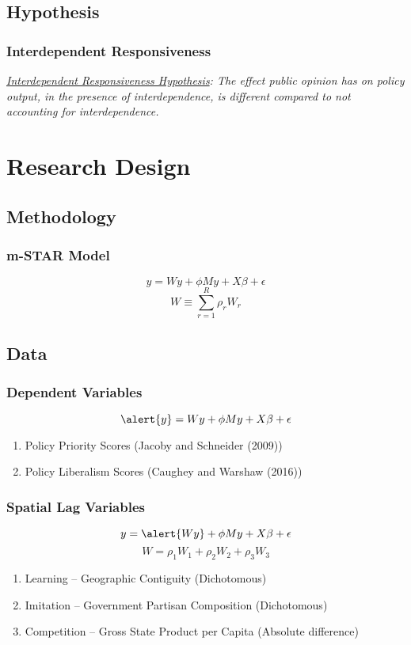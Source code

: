 \documentclass{beamer}
\begin{document}
\subsection{Hypothesis}

\begin{frame}
	\frametitle{Interdependent Responsiveness}
		\textit{\underline{Interdependent Responsiveness Hypothesis}: The effect public opinion has on policy output, in the presence of interdependence, is different compared to not accounting for interdependence.}
\end{frame}

\section{Research Design}
\subsection{Methodology}

\begin{frame}
	\frametitle{m-STAR Model}
		\[y=Wy+\phi My+X\beta+\epsilon\]
		\[W\equiv\sum^{R}_{r=1}\rho_{r}W_{r}\]
\end{frame}

\subsection{Data}

\begin{frame}
	\frametitle{Dependent Variables}
		\[\alert{y}=Wy+\phi My+X\beta+\epsilon\]
		\begin{enumerate}
			\item Policy Priority Scores (Jacoby and Schneider (2009))
			\item \alert{Policy Liberalism Scores (Caughey and Warshaw (2016))}
		\end{enumerate}
\end{frame}

\begin{frame}
	\frametitle{Spatial Lag Variables}
		\[y=\alert{Wy}+\phi My+X\beta+\epsilon\]
		\[W=\rho_{1}W_{1}+\rho_{2}W_{2}+\rho_{3}W_{3}\]
		\begin{enumerate}
			\item Learning -- Geographic Contiguity (Dichotomous)
			\item Imitation -- Government Partisan Composition (Dichotomous)
			\item Competition -- Gross State Product per Capita (Absolute difference)
		\end{enumerate}
\end{frame}
\end{document}
